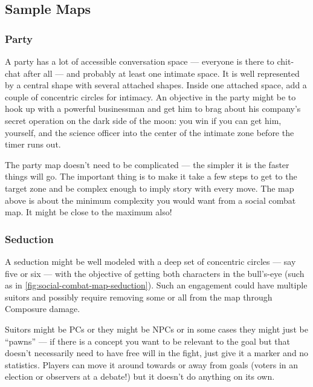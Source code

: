 
\subsection{Sample Maps}\label{sec:Sample Maps}


\subsubsection{Party}

A party has a lot of accessible conversation space --- everyone is there to chit-chat after all --- and probably at least one intimate space. It is well represented by a central shape with several attached shapes. Inside one attached space, add a couple of concentric circles for intimacy. An objective in the party might be to hook up with a powerful businessman and get him to brag about his company's secret operation on the dark side of the moon: you win if you can get him, yourself, and the science officer into the center of the intimate zone before the timer runs out.

The party map doesn't need to be complicated --- the simpler it is the faster things will go. The important thing is to make it take a few steps to get to the target zone and be complex enough to imply story with every move. The map above is about the minimum complexity you would want from a social combat map. It might be close to the maximum also!

\iflandscape{\clearpage}{}


\subsubsection{Seduction}



A seduction might be well modeled with a deep set of concentric circles --- say five or six --- with the objective of getting both characters in the bull's-eye (such as in \autoref{fig:social-combat-map-seduction}). Such an engagement could have multiple suitors and possibly require removing some or all from the map through Composure damage.


Suitors might be PCs or they might be NPCs or in some cases they might just be ``pawns'' --- if there is a concept you want to be relevant to the goal but that doesn't necessarily need to have free will in the fight, just give it a marker and no statistics. Players can move it around towards or away from goals (voters in an election or observers at a debate!) but it doesn't do anything on its own.

